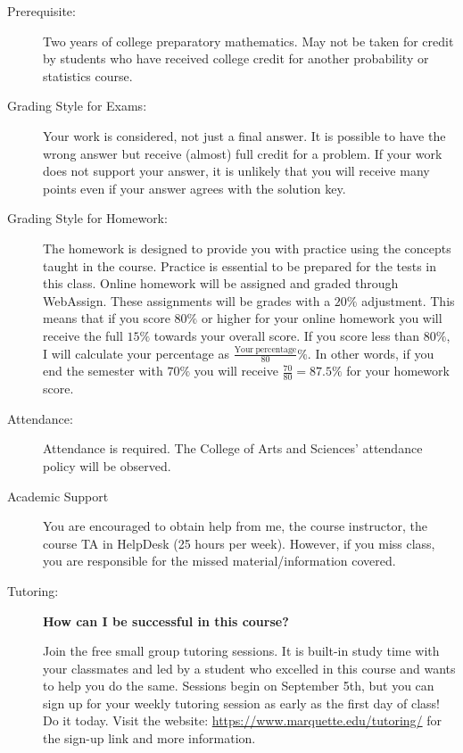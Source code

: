 \documentclass[10pt]{article}
\begin{document}
\begin{description}
\item[Prerequisite:] Two years of college preparatory mathematics. May not be taken for credit by students who have received college credit for another probability or statistics course.  

\item [Grading Style for Exams:] Your work is considered, not just a final answer. It is possible to have the wrong answer but receive (almost) full credit for a problem. If your work does not support your answer, it is unlikely that you will receive many points even if your answer agrees with the solution key.

\item [Grading Style for Homework:] The homework is designed to provide you with practice using the concepts taught in the course. Practice is essential to be prepared for the tests in this class. Online homework will be assigned and graded through WebAssign. These assignments will be grades with a $20\%$ adjustment. This means that if you score $80\%$ or higher for your online homework you will receive the full $15\%$ towards your overall score. If you score less than $80\%$, I will calculate your percentage as $\frac{\mathrm{Your\ percentage}}{80}\%$. In other words, if you end the semester with $70\%$ you will receive $\frac{70}{80}=87.5\%$ for your homework score.

\item [Attendance:] Attendance is required. The College of Arts and Sciences’ attendance policy will be observed. 

\item[Academic Support] You are encouraged to obtain help from me, the course instructor, the course TA in {\color{red} HelpDesk (25 hours per week)}. However, if you miss class, you are responsible for the missed material/information covered.\vspace{.1in}

\item [Tutoring:] \textbf{How can I be successful in this course?}

Join the free small group tutoring sessions. It is built-in study time with your classmates and led by a student who excelled in this course and wants to help you do the same.  Sessions begin on September 5th, but you can sign up for your weekly tutoring session as early as the first day of class!   Do it today.  Visit the website: \url{https://www.marquette.edu/tutoring/} for the sign-up link and more information.


\end{description}
\end{document}
